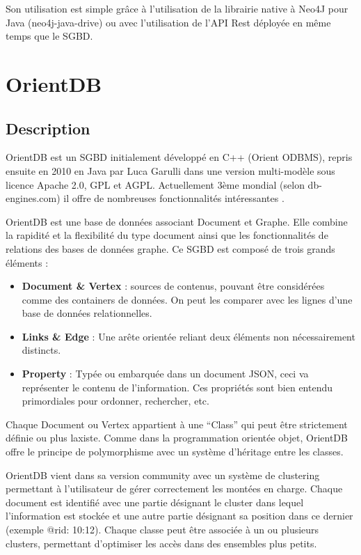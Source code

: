 \documentclass[a4paper,fleqn,12pt,oneside]{report}
\begin{document}
Son utilisation est simple grâce à l’utilisation de la librairie native à Neo4J pour Java (neo4j-java-drive) ou avec l’utilisation de l’API Rest déployée en même temps que le SGBD.

\section{OrientDB}


\subsection{Description}

OrientDB est un SGBD initialement développé en C++ (Orient ODBMS), repris ensuite en 2010 en Java par Luca Garulli dans une version multi-modèle sous licence Apache 2.0, GPL et AGPL. Actuellement 3ème mondial (selon db-engines.com) il offre de nombreuses fonctionnalités intéressantes \cite{OrientDBSite}.

OrientDB est une base de données associant Document et Graphe. Elle combine la rapidité et la flexibilité du type document ainsi que les fonctionnalités de relations des bases de données graphe.
\newpage
Ce SGBD est composé de trois grands éléments :

\begin{itemize}
\item \textbf{Document \& Vertex} : sources de contenus, pouvant être considérées comme des containers de données. On peut les comparer avec les lignes d'une base de données relationnelles.
\item \textbf{Links \& Edge} : Une arête orientée reliant deux éléments non nécessairement distincts.
\item \textbf{Property} : Typée ou embarquée dans un document JSON, ceci va représenter le contenu de l'information. Ces propriétés sont bien entendu primordiales pour ordonner, rechercher, etc.
\end{itemize}

Chaque Document ou Vertex appartient à une \enquote{Class} qui peut être strictement définie ou plus laxiste. Comme dans la programmation orientée objet, OrientDB offre le principe de polymorphisme avec un système d'héritage entre les classes. 

OrientDB vient dans sa version community avec un système de clustering permettant à l’utilisateur de gérer correctement les montées en charge. Chaque document est identifié avec une partie désignant le cluster dans lequel l’information est stockée et une autre partie désignant sa position dans ce dernier (exemple @rid: 10:12). Chaque classe peut être associée à un ou plusieurs clusters, permettant d’optimiser les accès dans des ensembles plus petits.
\end{document}
